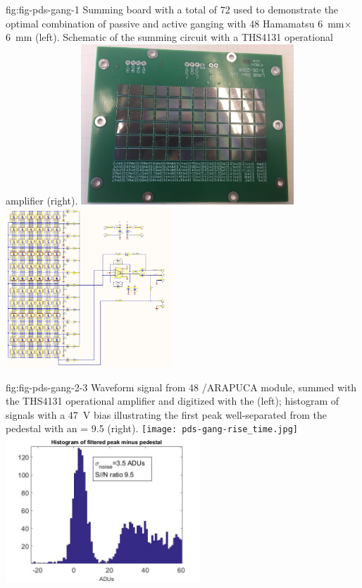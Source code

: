 \begin{dunefigure}
 {fig:fig-pds-gang-1}
 {Summing board with a total of 72  used to demonstrate the optimal combination of passive and active ganging with 48 Hamamatsu \SI{6}{mm}$\times$\SI{6}{mm}  (left).  Schematic of the summing circuit with a THS4131 operational amplifier (right).}
\includegraphics[height=6cm]{graphics/pds_gang_fig1.jpg}
\includegraphics[height=6cm]{graphics/pds_gang_fig2.png}
\end{dunefigure}



\begin{dunefigure}
 {fig:fig-pds-gang-2-3}
 {Waveform signal from 48 /ARAPUCA module, summed with the THS4131 operational amplifier and digitized with the   (left); histogram of signals with a \SI{47}{V} bias illustrating the first \phel peak well-separated from the pedestal with an  = 9.5 (right).}
\texttt{[image: pds-gang-rise\_time.jpg]}
\includegraphics[height=5.5cm]{graphics/pds-gang48-47v.jpg}
\end{dunefigure}

